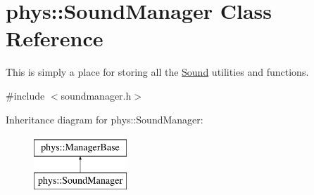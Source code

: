 \hypertarget{classphys_1_1SoundManager}{
\section{phys::SoundManager Class Reference}
\label{d1/dc4/classphys_1_1SoundManager}
}


This is simply a place for storing all the \hyperlink{classphys_1_1Sound}{Sound} utilities and functions.  




{\ttfamily \#include $<$soundmanager.h$>$}

Inheritance diagram for phys::SoundManager:\begin{figure}[H]
\begin{center}
\leavevmode
\includegraphics[height=2.000000cm]{d1/dc4/classphys_1_1SoundManager}
\end{center}
\end{figure}
